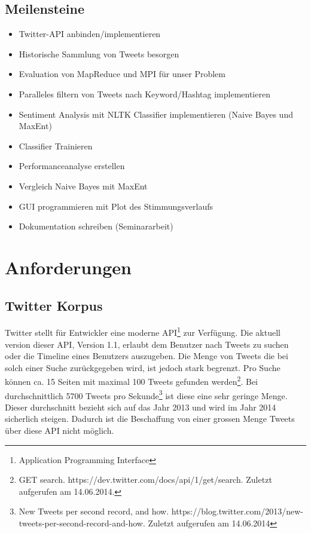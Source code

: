 \documentclass[12pt, oneside]{report}   	%
\begin{document}
\section{Meilensteine}
\begin{itemize}
\item Twitter-API anbinden/implementieren
\item Historische Sammlung von Tweets besorgen
\item Evaluation von MapReduce und MPI für unser Problem
\item Paralleles filtern von Tweets nach Keyword/Hashtag implementieren
\item Sentiment Analysis mit NLTK Classifier implementieren (Naive Bayes und MaxEnt)
\item Classifier Trainieren
\item Performanceanalyse erstellen
\item Vergleich Naive Bayes mit MaxEnt
\item GUI programmieren mit Plot des Stimmungsverlaufs
\item Dokumentation schreiben (Seminararbeit)
\end{itemize}


\chapter{Anforderungen}

\section{Twitter Korpus}
Twitter stellt für Entwickler eine moderne API\footnote{Application Programming Interface} zur Verfügung. Die aktuell version dieser API, Version 1.1, erlaubt dem Benutzer nach Tweets zu suchen oder die Timeline eines Benutzers auszugeben. Die Menge von Tweets die bei solch einer Suche zurückgegeben wird, ist jedoch stark begrenzt. Pro Suche können ca. 15 Seiten mit maximal 100 Tweets gefunden werden\footnote{GET search. https://dev.twitter.com/docs/api/1/get/search. Zuletzt aufgerufen am 14.06.2014.}. Bei durchschnittlich 5700 Tweets pro Sekunde\footnote{New Tweets per second record, and how. https://blog.twitter.com/2013/new-tweets-per-second-record-and-how. Zuletzt aufgerufen am 14.06.2014} ist diese eine sehr geringe Menge. Dieser durchschnitt bezieht sich auf das Jahr 2013 und wird im Jahr 2014 sicherlich steigen.
Dadurch ist die Beschaffung von einer grossen Menge Tweets über diese API nicht möglich.
\end{document}
